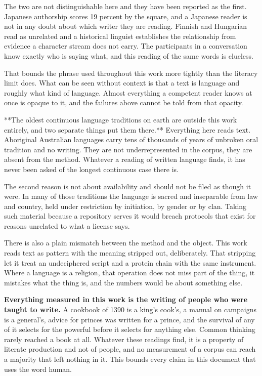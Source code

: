 The two are not distinguishable here and they have been reported as the first. Japanese authorship scores 19 percent by the square, and a Japanese reader is not in any doubt about which writer they are reading. Finnish and Hungarian read as unrelated and a historical linguist establishes the relationship from evidence a character stream does not carry. The participants in a conversation know exactly who is saying what, and this reading of the same words is clueless.

That bounds the phrase used throughout this work more tightly than the literacy limit does. What can be seen without context is that a text is language and roughly what kind of language. Almost everything a competent reader knows at once is opaque to it, and the failures above cannot be told from that opacity.

**The oldest continuous language traditions on earth are outside this work entirely, and two separate things put them there.** Everything here reads text. Aboriginal Australian languages carry tens of thousands of years of unbroken oral tradition and no writing. They are not underrepresented in the corpus, they are absent from the method. Whatever a reading of written language finds, it has never been asked of the longest continuous case there is.

The second reason is not about availability and should not be filed as though it were. In many of those traditions the language is sacred and inseparable from law and country, held under restriction by initiation, by gender or by clan. Taking such material because a repository serves it would breach protocols that exist for reasons unrelated to what a license says.

There is also a plain mismatch between the method and the object. This work reads text as pattern with the meaning stripped out, deliberately. That stripping let it treat an undeciphered script and a protein chain with the same instrument. Where a language is a religion, that operation does not miss part of the thing, it mistakes what the thing is, and the numbers would be about something else.

\textbf{Everything measured in this work is the writing of people who were taught to write.} A cookbook of 1390 is a king's cook's, a manual on campaigns is a general's, advice for princes was written for a prince, and the survival of any of it selects for the powerful before it selects for anything else. Common thinking rarely reached a book at all. Whatever these readings find, it is a property of literate production and not of people, and no measurement of a corpus can reach a majority that left nothing in it. This bounds every claim in this document that uses the word human.

